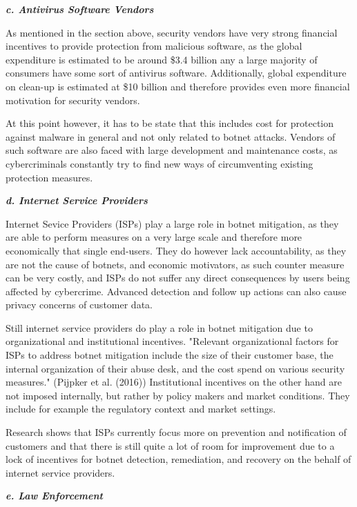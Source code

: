 \textbf{\textit{c. Antivirus Software Vendors}}

As mentioned in the section above, security vendors have very strong financial incentives to provide protection from malicious software, as the global expenditure is estimated to be around \$3.4 billion any a large majority of consumers have some sort of antivirus software.
Additionally, global expenditure on clean-up is estimated at \$10 billion and therefore provides even more financial motivation for security vendors.\cite{Anderson13}

At this point however, it has to be state that this includes cost for protection against malware in general and not only related to botnet attacks.
Vendors of such software are also faced with large development and maintenance costs, as cybercriminals constantly try to find new ways of circumventing existing protection measures.

\textbf{\textit{d. Internet Service Providers}}

Internet Sevice Providers (ISPs) play a large role in botnet mitigation, as they are able to perform measures on a very large scale and therefore more economically that single end-users.
They do however lack accountability, as they are not the cause of botnets, and economic motivators, as such counter measure can be very costly, and ISPs do not suffer any direct consequences by users being affected by cybercrime.
Advanced detection and follow up actions can also cause privacy concerns of customer data.\cite{Pijpker16}

Still internet service providers do play a role in botnet mitigation due to organizational and institutional incentives.
"Relevant organizational factors for ISPs to address botnet mitigation include the size of their customer base, the internal organization of their abuse desk, and the cost spend on various security measures." (Pijpker et al. (2016))
Institutional incentives on the other hand are not imposed internally, but rather by policy makers and market conditions.
They include for example the regulatory context and market settings.\cite{Pijpker16}

Research shows that ISPs currently focus more on prevention and notification of customers and that there is still quite a lot of room for improvement due to a lock of incentives for botnet detection, remediation, and recovery on the behalf of internet service providers.\cite{Pijpker16}

\textbf{\textit{e. Law Enforcement}}

